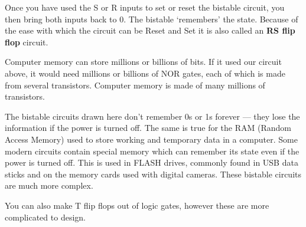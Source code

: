 Once you have used the S or R inputs to set or reset the bistable circuit, you then bring both inputs back to 0.  The bistable `remembers' the state.  Because of the ease with which the circuit can be Reset and Set it is also called an {\bf RS flip flop} circuit.

Computer memory can store millions or billions of bits.  If it used our circuit above, it would need millions or billions of NOR gates, each of which is made from several transistors.  Computer memory is made of many millions of transistors.

\begin{IFact}{The bistable circuits drawn here don't remember 0s or 1s forever --- they lose the information if the power is turned off.  The same is true for the RAM (Random Access Memory) used to store working and temporary data in a computer.  Some modern circuits contain special memory which can remember its state even if the power is turned off.  This is used in FLASH drives, commonly found in USB data sticks and on the memory cards used with digital cameras.  These bistable circuits are much more complex.}  \end{IFact}

You can also make T flip flops out of logic gates, however these are more complicated to design.




